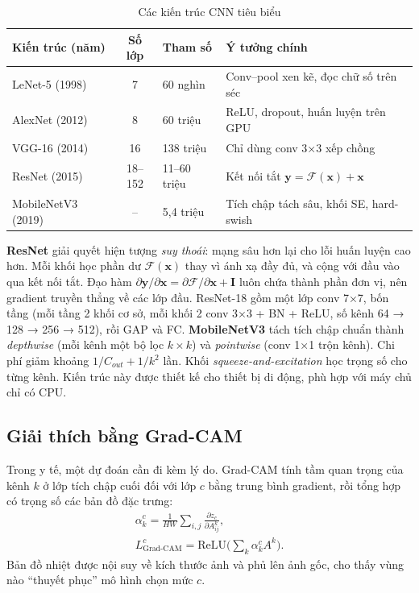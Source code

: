 \begin{table}[H]
\centering
\caption{Các kiến trúc CNN tiêu biểu}
\label{tab:cnn-arch}
\small
\begin{tabularx}{\linewidth}{@{}L{2.6cm}cL{2.0cm}Y@{}}
\toprule
\textbf{Kiến trúc (năm)} & \textbf{Số lớp} & \textbf{Tham số} & \textbf{Ý tưởng chính} \\
\midrule
LeNet-5 (1998) \cite{lecun1998} & 7 & 60 nghìn & Conv–pool xen kẽ, đọc chữ số trên séc \\
AlexNet (2012) \cite{krizhevsky2012} & 8 & 60 triệu & ReLU, dropout, huấn luyện trên GPU \\
VGG-16 (2014) \cite{simonyan2015} & 16 & 138 triệu & Chỉ dùng conv 3×3 xếp chồng \\
ResNet (2015) \cite{he2016} & 18–152 & 11–60 triệu & Kết nối tắt $\mathbf y = \mathcal F(\mathbf x) + \mathbf x$ \\
MobileNetV3 (2019) \cite{howard2019} & -- & 5,4 triệu & Tích chập tách sâu, khối SE, hard-swish \\
\bottomrule
\end{tabularx}
\end{table}

\textbf{ResNet} giải quyết hiện tượng \emph{suy thoái}: mạng sâu hơn lại cho lỗi huấn luyện cao hơn. Mỗi khối học phần dư $\mathcal F(\mathbf x)$ thay vì ánh xạ đầy đủ, và cộng với đầu vào qua kết nối tắt. Đạo hàm $\partial\mathbf y/\partial\mathbf x = \partial\mathcal F/\partial\mathbf x + \mathbf I$ luôn chứa thành phần đơn vị, nên gradient truyền thẳng về các lớp đầu. ResNet-18 gồm một lớp conv 7×7, bốn tầng (mỗi tầng 2 khối cơ sở, mỗi khối 2 conv 3×3 + BN + ReLU, số kênh 64 → 128 → 256 → 512), rồi GAP và FC.
\textbf{MobileNetV3} tách tích chập chuẩn thành \emph{depthwise} (mỗi kênh một bộ lọc $k\times k$) và \emph{pointwise} (conv 1×1 trộn kênh). Chi phí giảm khoảng $1/C_{out}+1/k^2$ lần. Khối \emph{squeeze-and-excitation} học trọng số cho từng kênh. Kiến trúc này được thiết kế cho thiết bị di động, phù hợp với máy chủ chỉ có CPU.

\subsection{Giải thích bằng Grad-CAM}

Trong y tế, một dự đoán cần đi kèm lý do. Grad-CAM \cite{selvaraju2017} tính tầm quan trọng của kênh $k$ ở lớp tích chập cuối đối với lớp $c$ bằng trung bình gradient, rồi tổng hợp có trọng số các bản đồ đặc trưng:
\begin{equation}
\begin{gathered}
\alpha_k^c = \frac{1}{HW}\sum_{i,j}\frac{\partial z_c}{\partial A^k_{ij}}, \\
L^c_{\text{Grad-CAM}} = \mathrm{ReLU}\Big(\sum_k \alpha_k^c A^k\Big).
\end{gathered}
\label{eq:gradcam}
\end{equation}
Bản đồ nhiệt được nội suy về kích thước ảnh và phủ lên ảnh gốc, cho thấy vùng nào ``thuyết phục'' mô hình chọn mức $c$.

